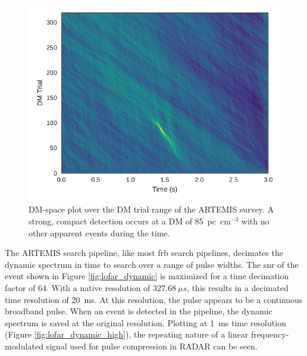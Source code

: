 \documentclass[a4paper,fleqn,usenatbib]{mnras}
\begin{document}
\begin{figure}
    \includegraphics[width=1.0\linewidth]{figures/LOFAR_dm_time.pdf}
    \caption{DM-space plot over the DM trial range of the ARTEMIS survey. A
    strong, compact detection occurs at a DM of 85~pc~cm$^{-3}$ with no other
    apparent events during the time.
    }
    \label{fig:lofar_dm_time}
\end{figure}

The ARTEMIS search pipeline, like most \gls{frb} search pipelines, decimates the
dynamic spectrum in time to search over a range of pulse widths. The \gls{snr}
of the event shown in Figure \ref{fig:lofar_dynamic} is maximized for a time
decimation factor of 64. With a native resolution of $327.68~\mu s$, this
results in a decimated time resolution of 20~ms. At this resolution, the pulse
appears to be a continuous broadband pulse. When an event is detected in the
pipeline, the dynamic spectrum is saved at the original resolution. Plotting at
1~ms time resolution (Figure \ref{fig:lofar_dynamic_high}), the repeating nature
of a linear frequency-modulated signal used for pulse compression in RADAR can
be seen.
\end{document}
